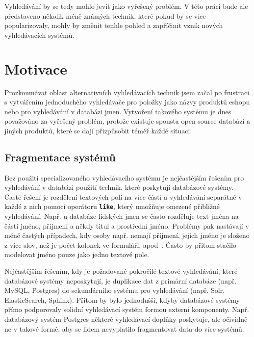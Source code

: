 \documentclass[11pt,letterpaper,oneside,openright]{book}
\newcommand{\bftt}[1]{\texttt{\textbf{#1}}}
\begin{document}
Vyhledávání by se tedy mohlo jevit jako vyřešený problém. V této práci bude ale
představeno několik méně známých technik, které pokud by se více
popularizovaly, mohly by změnit tenhle pohled a zapříčinit vznik nových
vyhledávacích systémů.



\section{Motivace}
Prozkoumávat oblast alternativních vyhledávacích technik jsem začal po
frustraci s vytvářením jednoduchého vyhledávače pro položky jako názvy produktů
eshopu nebo pro vyhledávání v databázi jmen. Vytvoření takového systému je dnes
považováno za vyřešený problém, protože existuje spousta open source databází a
jiných produktů, které se dají přizpůsobit téměř každé situaci.

\subsection{Fragmentace systémů}
Bez použití specializovaného vyhledávacího systému je nejčastějším řešením pro
vyhledávání v databázi použití technik, které poskytují databázové systémy.
Časté řešení je rozdělení textových polí na více částí a vyhledávání separátně
v každé z nich pomocí operátoru \bftt{like}, který umožňuje omezené přibližné
vyhledávání. Např. u databáze lidských jmen se často rozděluje text jména na části
jméno, příjmení a někdy titul a prostřední jméno. Problémy pak nastávají v méně
častých případech, kdy osoby např. nemají příjmení, jejich jméno je složeno z
více slov, než je počet kolonek ve formuláři, apod~\cite{name_falsehoods}.
Často by přitom stačilo modelovat jméno pouze jako jedno textové pole.

Nejčastějším řešením, kdy je požadované pokročilé textové vyhledávání, které
databázové systémy neposkytují, je duplikace dat z primární databáze (např.
MySQL, Postgres) do sekundárního systému pro vyhledávání (např. Solr,
ElasticSearch, Sphinx). Přitom by bylo jednodušší, kdyby databázové systémy
přímo podporovaly solidní vyhledávací systém formou externí komponenty. Např.
databázový systém Postgres některé vyhledávací doplňky poskytuje, ale očividně
ne v takové formě, aby se lidem nevyplatilo fragmentovat data do více systémů.
\end{document}
